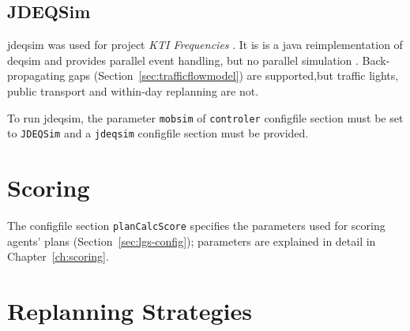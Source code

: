 
\subsection{JDEQSim}
\label{sec:using-jdeqsim}
\gls{jdeqsim} \citep[][]{WaraichEtAl_TechRep_IVT_2009, WaraichEtAl_STRC_2009} was used for project \emph{KTI Frequencies} \citep[][]{BalmerEtAl_ResRep_datapuls_2010}. It is is a \gls{java} reimplementation of \gls{deqsim} \citep[][]{WaraichEtAl_STRC_2009, CharyparEtAl_TRR_2007, CharyparEtAl_TRB_2009} and provides parallel event handling, but no parallel simulation \citep[][p.11]{BalmerEtAl_ResRep_datapuls_2010}. Back-propagating gaps (Section~\ref{sec:trafficflowmodel}) are supported,but traffic lights, public transport and within-day replanning are not.

To run \gls{jdeqsim}, the parameter \lstinline|mobsim| of \lstinline|controler| \gls{configfile} section must be set to \lstinline|JDEQSim| and a \lstinline|jdeqsim| \gls{configfile} section must be provided. 

\section{Scoring}
\label{sec:using-scoring}
The \gls{configfile} section \lstinline|planCalcScore| specifies the parameters used for scoring agents' plans (Section~\ref{sec:lgs-config}); parameters are explained in detail in Chapter~\ref{ch:scoring}.


\section{Replanning Strategies}
\label{sec:strategymodules}

